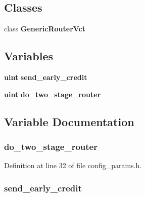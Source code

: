 \subsection*{Classes}
\begin{CompactItemize}
\item 
class {\bf GenericRouterVct}
\end{CompactItemize}
\subsection*{Variables}
\begin{CompactItemize}
\item 
{\bf uint} {\bf send\_\-early\_\-credit}
\item 
{\bf uint} {\bf do\_\-two\_\-stage\_\-router}
\end{CompactItemize}


\subsection{Variable Documentation}
\subsubsection[{do\_\-two\_\-stage\_\-router}]{ {\bf do\_\-two\_\-stage\_\-router}}\label{genericRouterVct_8h_5ef61643d57baddad3f036737403d4cf}




Definition at line 32 of file config\_\-params.h.
\subsubsection[{send\_\-early\_\-credit}]{ {\bf send\_\-early\_\-credit}}\label{genericRouterVct_8h_97bd678cd4246f1a0157eff907e3fea1}


